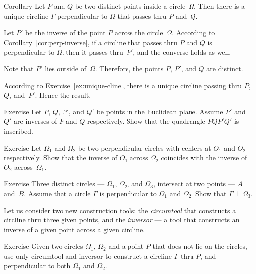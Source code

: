 \begin{thm}{Corollary}\label{cor:h-line} 
Let $P$ and $Q$ be two distinct points inside a circle~$\Omega$.
Then there is a unique circline $\Gamma$ perpendicular to $\Omega$ that passes thru $P$ and~$Q$.  
\end{thm}

Let $P'$ be the inverse of the point $P$ across the circle~$\Omega$.
According to Corollary~\ref{cor:perp-inverse},
if a circline that passes thru $P$ and $Q$ is perpendicular to $\Omega$, then it passes thru~$P'$, and the converse holds as well.

Note that $P'$ lies outside of~$\Omega$.
Therefore, the points $P$, $P'$, and $Q$ are distinct.

According to Exercise~\ref{ex:unique-cline},
there is a unique circline passing thru $P$, $Q$, and~$P'$.
Hence the result.
\qeds

\begin{thm}{Exercise}\label{ex:inscribed+inv}
Let $P$, $Q$, $P'$, and $Q'$ be points in the Euclidean plane.
Assume $P'$ and $Q'$ are inverses of $P$ and $Q$ respectively.
Show that the quadrangle $PQP'Q'$ is inscribed.
\end{thm}

\begin{thm}{Exercise}\label{ex:centers-of-perp-circles}
Let $\Omega_1$ and $\Omega_2$ be two perpendicular circles with centers at $O_1$ and $O_2$ respectively.
Show that the inverse of $O_1$ across $\Omega_2$ 
coincides with 
the inverse of $O_2$ across~$\Omega_1$.
\end{thm}

\begin{thm}{Exercise}\label{ex:4-th-perp-circ}
Three distinct circles --- $\Omega_1$, $\Omega_2$, and $\Omega_3$, intersect at two points --- $A$ and~$B$.
Assume that a circle $\Gamma$ is perpendicular to $\Omega_1$ and $\Omega_2$.
Show that $\Gamma\perp\Omega_3$.
\end{thm}

Let us consider two new construction tools:
the \emph{circumtool} that constructs a circline thru three given points, 
and the \emph{inversor} --- a tool that constructs an inverse of a given point across a given circline.

\begin{thm}{Exercise}\label{ex:construction-perp-clines}
Given  two circles $\Omega_1$, $\Omega_2$ and a point $P$ that does not lie on the circles,
use only circumtool and inversor to construct a circline $\Gamma$ thru $P$, 
and perpendicular to both $\Omega_1$ and $\Omega_2$.
\end{thm}

